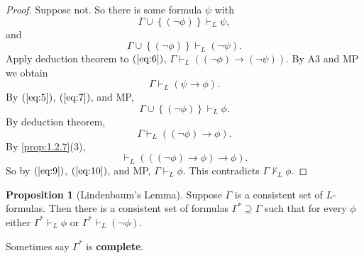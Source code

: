 \documentclass{article}
\newcommand{\rb}[1]{\left( #1 \right)}
\newcommand{\cb}[1]{\left\{ #1 \right\}}
\newcommand{\notb}[1]{\rb{\neg #1}}
\newcommand{\impb}[2]{\rb{#1 \rightarrow #2}}
\theoremstyle{definition}\newtheorem{definition}{Definition}[subsection]
\theoremstyle{definition}\newtheorem{remark}[definition]{Remark}
\theoremstyle{definition}\newtheorem*{example}{Example}
\theoremstyle{definition}\newtheorem*{note}{Note}
\newtheorem{proposition}[definition]{Proposition}
\begin{document}
\begin{proof}
Suppose not. So there is some formula $ \psi $ with
\begin{equation}
\label{eq:5}
\Gamma \cup \cb{\notb{\phi}} \vdash_L \psi,
\end{equation}
and
\begin{equation}
\label{eq:6}
\Gamma \cup \cb{\notb{\phi}} \vdash_L \notb{\psi}.
\end{equation}
Apply deduction theorem to $ \rb{\ref{eq:6}} $, $ \Gamma \vdash_L \impb{\notb{\phi}}{\notb{\psi}} $. By A3 and MP we obtain
\begin{equation}
\label{eq:7}
\Gamma \vdash_L \impb{\psi}{\phi}.
\end{equation}
By $ \rb{\ref{eq:5}} $, $ \rb{\ref{eq:7}} $, and MP,
\begin{equation}
\label{eq:8}
\Gamma \cup \cb{\notb{\phi}} \vdash_L \phi.
\end{equation}
By deduction theorem,
\begin{equation}
\label{eq:9}
\Gamma \vdash_L \impb{\notb{\phi}}{\phi}.
\end{equation}
By \ref{prop:1.2.7}(3),
\begin{equation}
\label{eq:10}
\vdash_L \impb{\impb{\notb{\phi}}{\phi}}{\phi}.
\end{equation}
So by $ \rb{\ref{eq:9}} $, $ \rb{\ref{eq:10}} $, and MP, $ \Gamma \vdash_L \phi $. This contradicts $ \Gamma \not\vdash_L \phi $.
\end{proof}

\begin{proposition}[Lindenbaum's Lemma]
Suppose $ \Gamma $ is a consistent set of $ L $-formulas. Then there is a consistent set of formulas $ \Gamma^* \supseteq \Gamma $ such that for every $ \phi $ either $ \Gamma^* \vdash_L \phi $ or $ \Gamma^* \vdash_L \notb{\phi} $.
\end{proposition}

Sometimes say $ \Gamma^* $ is \textbf{complete}.
\end{document}
